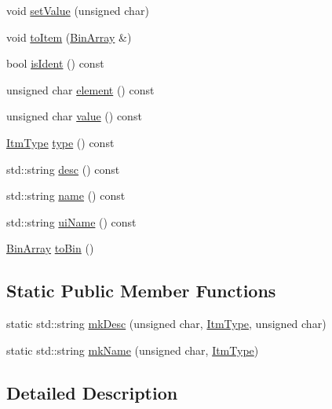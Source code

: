\begin{DoxyCompactItemize}
\item 
void \hyperlink{class_flow_1_1_item_a7d75440f38fee7525f378c5115fdebfe}{set\+Value} (unsigned char)
\item 
void \hyperlink{class_flow_1_1_item_a0dab51061ec049d574225ebbf1a1ee31}{to\+Item} (\hyperlink{class_flow_1_1_bin_array}{Bin\+Array} \&)
\item 
bool \hyperlink{class_flow_1_1_item_a36f99337aed738b15667a7e5a9d51c37}{is\+Ident} () const
\item 
unsigned char \hyperlink{class_flow_1_1_item_ae108f4ebbdcd75ac4d4ee1d009330040}{element} () const
\item 
unsigned char \hyperlink{class_flow_1_1_item_af475c6f792312b9ad95dae06b6cb29b6}{value} () const
\item 
\hyperlink{namespace_flow_ab521722c5aec75faa5be9c5ccfff33d6}{Itm\+Type} \hyperlink{class_flow_1_1_item_a559618381e678afb9feba88e7d065956}{type} () const
\item 
std\+::string \hyperlink{class_flow_1_1_item_abcef9ab26e69e0a89422a255612e821e}{desc} () const
\item 
std\+::string \hyperlink{class_flow_1_1_item_a176977d10b96c739e28870bd928e34f8}{name} () const
\item 
std\+::string \hyperlink{class_flow_1_1_item_a8ff7cdd3f7c30f3afbf7b1da2845bc20}{ui\+Name} () const
\item 
\hyperlink{class_flow_1_1_bin_array}{Bin\+Array} \hyperlink{class_flow_1_1_item_a47f0733443d0a22925f8c9fccfd94ca7}{to\+Bin} ()
\end{DoxyCompactItemize}
\subsection*{Static Public Member Functions}
\begin{DoxyCompactItemize}
\item 
static std\+::string \hyperlink{class_flow_1_1_item_a59df9c613b1748f81207891269675286}{mk\+Desc} (unsigned char, \hyperlink{namespace_flow_ab521722c5aec75faa5be9c5ccfff33d6}{Itm\+Type}, unsigned char)
\item 
static std\+::string \hyperlink{class_flow_1_1_item_a65adc1636106d296d0326ac18f27a805}{mk\+Name} (unsigned char, \hyperlink{namespace_flow_ab521722c5aec75faa5be9c5ccfff33d6}{Itm\+Type})
\end{DoxyCompactItemize}


\subsection{Detailed Description}


